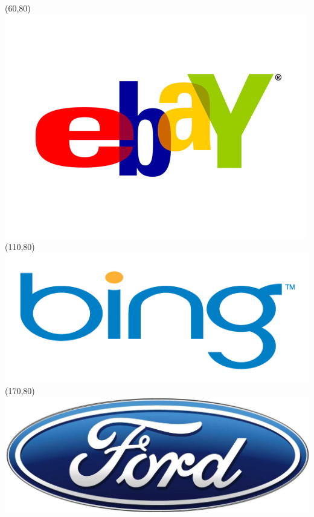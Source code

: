 \begin{frame}
\Put(60,80){\includegraphics[scale=.12]{../common/pics/logos/ebay}}
\Put(110,80){\includegraphics[scale=.12]{../common/pics/logos/bing}}
\Put(170,80){\includegraphics[scale=.29]{../common/pics/logos/ford}}
\end{frame}



